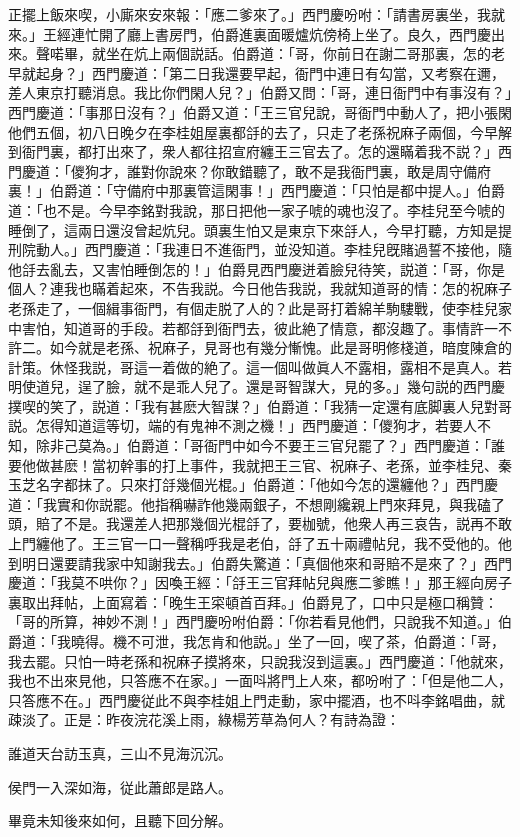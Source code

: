 正擺上飯來喫，小廝來安來報：「應二爹來了。」西門慶吩咐：「請書房裏坐，我就來。」王經連忙開了廳上書房門，伯爵進裏面暖爐炕傍椅上坐了。良久，西門慶出來。聲喏畢，就坐在炕上兩個説話。伯爵道：「哥，你前日在謝二哥那裏，怎的老早就起身？」西門慶道：「第二日我還要早起，衙門中連日有勾當，又考察在邇，差人東京打聽消息。我比你們閑人兒？」伯爵又問：「哥，連日衙門中有事沒有？」西門慶道：「事那日沒有？」伯爵又道：「王三官兒說，哥衙門中動人了，把小張閑他們五個，初八日晚夕在李桂姐屋裏都㧱的去了，只走了老孫祝麻子兩個，今早解到衙門裏，都打出來了，衆人都往招宣府纏王三官去了。怎的還瞞着我不説？」西門慶道：「儍狗才，誰對你說來？你敢錯聽了，敢不是我衙門裏，敢是周守備府裏！」伯爵道：「守備府中那裏管這閑事！」西門慶道：「只怕是都中提人。」伯爵道：「也不是。今早李銘對我說，那日把他一家子唬的魂也沒了。李桂兒至今唬的睡倒了，這兩日還沒曾起炕兒。頭裏生怕又是東京下來㧱人，今早打聽，方知是提刑院動人。」西門慶道：「我連日不進衙門，並没知道。李桂兒旣賭過誓不接他，隨他㧱去亂去，又害怕睡倒怎的！」伯爵見西門慶迸着臉兒待笑，説道：「哥，你是個人？連我也瞞着起來，不告我説。今日他告我説，我就知道哥的情：怎的祝麻子老孫走了，一個緝事衙門，有個走脱了人的？此是哥打着綿羊駒䮫戰，使李桂兒家中害怕，知道哥的手段。若都㧱到衙門去，彼此絶了情意，都沒趣了。事情許一不許二。如今就是老孫、祝麻子，見哥也有幾分慚愧。此是哥明修棧道，暗度陳倉的計策。休怪我説，哥這一着做的絶了。這一個叫做眞人不露相，露相不是真人。若明使道兒，逞了臉，就不是乖人兒了。還是哥智謀大，見的多。」幾句説的西門慶撲喫的笑了，説道：「我有甚麽大智謀？」伯爵道：「我猜一定還有底脚裏人兒對哥説。怎得知道這等切，端的有鬼神不測之機！」西門慶道：「儍狗才，若要人不知，除非己莫為。」伯爵道：「哥衙門中如今不要王三官兒罷了？」西門慶道：「誰要他做甚麽！當初幹事的打上事件，我就把王三官、祝麻子、老孫，並李桂兒、秦玉芝名字都抹了。只來打㧱幾個光棍。」伯爵道：「他如今怎的還纏他？」西門慶道：「我實和你説罷。他指稱嚇詐他幾兩銀子，不想剛纔親上門來拜見，與我磕了頭，賠了不是。我還差人把那幾個光棍㧱了，要枷號，他衆人再三哀告，説再不敢上門纏他了。王三官一口一聲稱呼我是老伯，㧱了五十兩禮帖兒，我不受他的。他到明日還要請我家中知謝我去。」伯爵失驚道：「真個他來和哥賠不是來了？」西門慶道：「我莫不哄你？」因喚王經：「㧱王三官拜帖兒與應二爹瞧！」那王經向房子裏取出拜帖，上面寫着：「晚生王寀頓首百拜。」伯爵見了，口中只是極口稱贊：「哥的所算，神妙不測！」西門慶吩咐伯爵：「你若看見他們，只說我不知道。」伯爵道：「我曉得。機不可泄，我怎肯和他説。」坐了一回，喫了茶，伯爵道：「哥，我去罷。只怕一時老孫和祝麻子摸將來，只說我沒到這裏。」西門慶道：「他就來，我也不出來見他，只答應不在家。」一面呌將門上人來，都吩咐了：「但是他二人，只答應不在。」西門慶従此不與李桂姐上門走動，家中擺酒，也不呌李銘唱曲，就疎淡了。正是：昨夜浣花溪上雨，綠楊芳草為何人？有詩為證：

\begin{myquote}
誰道天台訪玉真，三山不見海沉沉。

侯門一入深如海，従此蕭郎是路人。
\end{myquote}

畢竟未知後來如何，且聽下回分解。

